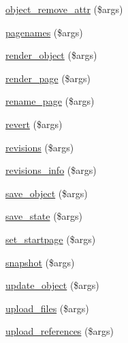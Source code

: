 \begin{DoxyCompactItemize}
\item 
\hyperlink{module__glue_8inc_8php_ae16d748c2d933978daec8bf11acdc34b}{object\_\-remove\_\-attr} (\$args)
\item 
\hyperlink{module__glue_8inc_8php_a354fc85f928484ae3b316bbf0065d9bd}{pagenames} (\$args)
\item 
\hyperlink{module__glue_8inc_8php_ae9103a74e4b40e88536fbc0a52d1c72f}{render\_\-object} (\$args)
\item 
\hyperlink{module__glue_8inc_8php_aab1981a767de519c6c4afb946d748d0a}{render\_\-page} (\$args)
\item 
\hyperlink{module__glue_8inc_8php_acd08b36587528b6f088cafb7d1d6bd29}{rename\_\-page} (\$args)
\item 
\hyperlink{module__glue_8inc_8php_ae69e25beb40feedc02d3b850587d20cc}{revert} (\$args)
\item 
\hyperlink{module__glue_8inc_8php_a27d90d2ed1b4142554bc4e0e47e9ba0c}{revisions} (\$args)
\item 
\hyperlink{module__glue_8inc_8php_a1dc65b69a920ac4ebc8f7c1df305060b}{revisions\_\-info} (\$args)
\item 
\hyperlink{module__glue_8inc_8php_ab294f21c7f6fed0932b65167f180c78c}{save\_\-object} (\$args)
\item 
\hyperlink{module__glue_8inc_8php_a60d03d7a0d8783e926835f0aa6cff698}{save\_\-state} (\$args)
\item 
\hyperlink{module__glue_8inc_8php_aafa7a8fa046ff6119cb7506d68edf787}{set\_\-startpage} (\$args)
\item 
\hyperlink{module__glue_8inc_8php_a5d3ad02088eee566589cd47fe0dc889a}{snapshot} (\$args)
\item 
\hyperlink{module__glue_8inc_8php_a4aed316adcde13b40c9fc1b35e6537a4}{update\_\-object} (\$args)
\item 
\hyperlink{module__glue_8inc_8php_a43746135e67f614d79317029aced064b}{upload\_\-files} (\$args)
\item 
\hyperlink{module__glue_8inc_8php_a2099347b9bdf5a5973a13e5f7a4be933}{upload\_\-references} (\$args)
\end{DoxyCompactItemize}


